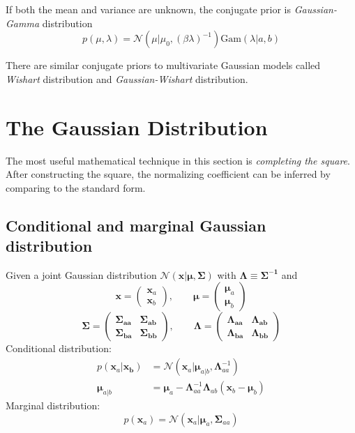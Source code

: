 \documentclass[a4paper]{report}
\newcommand{\up}{\mathrm}
\renewcommand{\bf}{\mathbf}
\renewcommand{\cal}{\mathcal}
\begin{document}
If both the mean and variance are unknown, the conjugate prior is \emph{Gaussian-Gamma} distribution
\begin{equation}
	p(\mu,\lambda)=\cal{N}(\mu|\mu_0,(\beta\lambda)^{-1})\up{Gam}(\lambda|a,b)
\end{equation}

There are similar conjugate priors to multivariate Gaussian models called \emph{Wishart} distribution and \emph{Gaussian-Wishart} distribution.
\section{The Gaussian Distribution}
The most useful mathematical technique in this section is \emph{completing the square}. After constructing the square, the normalizing coefficient can be inferred by comparing to the standard form.
\subsection{Conditional and marginal Gaussian distribution}
Given a joint Gaussian distribution $\cal{N}(\bf{x}|\boldsymbol{\mu},\boldsymbol\Sigma)$ with $\boldsymbol{\Lambda\equiv \Sigma^{-1}}$ and
\begin{equation}
\bf{x}=\left( \begin{array}{c}
\bf{x}_a \\ \bf{x}_b
\end{array} \right) ,\qquad \boldsymbol{\mu}=\left(\begin{array}{c}
\boldsymbol{\mu}_a\\
\boldsymbol{\mu}_b
\end{array}\right)
\end{equation} 
\begin{equation}
\boldsymbol{\Sigma}=\boldsymbol{\begin{pmatrix}
\Sigma_{aa} & \Sigma_{ab} \\
\Sigma_{ba} & \Sigma_{bb}
\end{pmatrix}},\qquad 
\boldsymbol{\Lambda=\begin{pmatrix}
\Lambda_{aa} & \Lambda_{ab}\\
\Lambda_{ba} & \Lambda_{bb}
\end{pmatrix}}
\end{equation}
Conditional distribution:
\begin{align}
p(\bf{x}_a|\bf{x_b})&=\cal{N}(\bf{x}_a|\boldsymbol{\mu}_{a|b},\boldsymbol\Lambda_{aa}^{-1})\\
\boldsymbol{\mu}_{a|b}&=\boldsymbol \mu_a - \boldsymbol{\Lambda}_{aa}^{-1}\boldsymbol{\Lambda}_{ab}(\bf{x}_b-\boldsymbol{\mu}_b)
\end{align}
Marginal distribution:
\begin{equation}
	p(\bf{x}_a)=\cal{N}(\bf{x}_a|\boldsymbol{\mu}_a,\boldsymbol{\Sigma}_{aa})
\end{equation}
\end{document}
